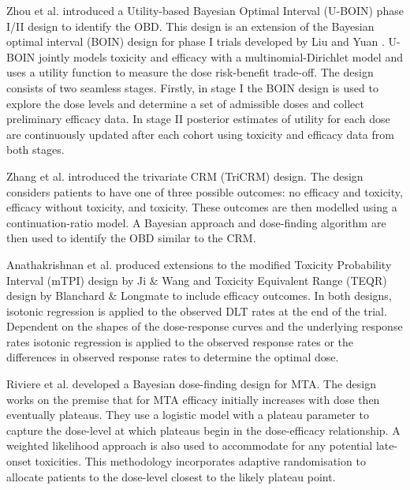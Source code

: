 Zhou et al. \cite{zhouUtilitybasedBayesianOptimal2019} introduced a Utility-based Bayesian Optimal Interval (U-BOIN) phase \RN{1}/\RN{2} design to identify the OBD. This design is an extension of the Bayesian optimal interval (BOIN) design for phase \RN{1} trials developed by Liu and Yuan \cite{liuBAYESIANDATAAUGMENTATION2013}. U-BOIN jointly models toxicity and efficacy with a multinomial-Dirichlet model and uses a utility function to measure the dose risk-benefit trade-off. The design consists of two seamless stages. Firstly, in stage \RN{1} the BOIN design is used to explore the dose levels and determine a set of admissible doses and collect preliminary efficacy data. In stage \RN{2} posterior estimates of utility for each dose are continuously updated after each cohort using toxicity and efficacy data from both stages. 

Zhang et al. \cite{zhangAdaptiveDosefindingDesign2006} introduced the trivariate CRM (TriCRM) design. The design considers patients to have one of three possible outcomes: no efficacy and toxicity, efficacy without toxicity, and toxicity. These outcomes are then modelled using a continuation-ratio model. A Bayesian approach and dose-finding algorithm are then used to identify the OBD similar to the CRM.  

Anathakrishnan et al. \cite{ananthakrishnanExtensionsMTPITEQR2018} produced extensions to the modified Toxicity Probability Interval (mTPI) design by Ji \& Wang \cite{jiModifiedToxicityProbability2013} and Toxicity Equivalent Range (TEQR) design by Blanchard \& Longmate \cite{blanchardToxicityEquivalenceRange2011} to include efficacy outcomes. In both designs, isotonic regression is applied to the observed DLT rates at the end of the trial. Dependent on the shapes of the dose-response curves and the underlying response rates isotonic regression is applied to the observed response rates or the differences in observed response rates to determine the optimal dose. 

Riviere et al. \cite{rivierePhaseIIDosefinding2018} developed a Bayesian dose-finding design for MTA. The design works on the premise that for MTA efficacy initially increases with dose then eventually plateaus. They use a logistic model with a plateau parameter to capture the dose-level at which plateaus begin in the dose-efficacy relationship. A weighted likelihood approach is also used to accommodate for any potential late-onset toxicities. This methodology incorporates adaptive randomisation to allocate patients to the dose-level closest to the likely plateau point.

